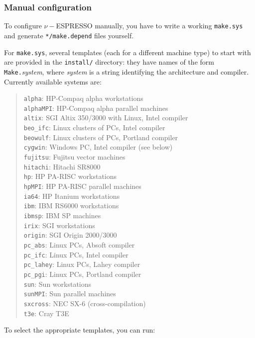 \documentclass[12pt,a4paper]{article}
\begin{document}
\subsubsection{Manual configuration}
  \label{manualconf}

To configure $\nu-$ESPRESSO manually, you have to write a working
\texttt{make.sys} and generate \texttt{*/make.depend} files yourself.

For \texttt{make.sys}, several templates (each for a different machine
type) to start with are provided in the \texttt{install/} directory:
they have names of the form \texttt{Make.}\emph{system}, where
\emph{system} is a string identifying the architecture and compiler.
Currently available systems are:
\begin{quote}
  \texttt{alpha}:     HP-Compaq alpha workstations\\
  \texttt{alphaMPI}:  HP-Compaq alpha parallel machines\\
  \texttt{altix}:     SGI Altix 350/3000 with Linux, Intel compiler\\
  \texttt{beo\_ifc}:  Linux clusters of PCs, Intel compiler\\
  \texttt{beowulf}:   Linux clusters of PCs, Portland compiler\\
  \texttt{cygwin}:    Windows PC, Intel compiler (see below)\\
  \texttt{fujitsu}:   Fujitsu vector machines\\
  \texttt{hitachi}:   Hitachi SR8000\\
  \texttt{hp}:        HP PA-RISC workstations\\
  \texttt{hpMPI}:     HP PA-RISC parallel machines\\
  \texttt{ia64}:      HP Itanium workstations\\
  \texttt{ibm}:       IBM RS6000 workstations\\
  \texttt{ibmsp}:     IBM SP machines\\
  \texttt{irix}:      SGI workstations\\
  \texttt{origin}:    SGI Origin 2000/3000\\
  \texttt{pc\_abs}:   Linux PCs, Absoft compiler\\
  \texttt{pc\_ifc}:   Linux PCs, Intel compiler\\
  \texttt{pc\_lahey}: Linux PCs, Lahey compiler\\
  \texttt{pc\_pgi}:   Linux PCs, Portland compiler\\
  \texttt{sun}:       Sun workstations\\
  \texttt{sunMPI}:    Sun parallel machines\\
  \texttt{sxcross}:   NEC SX-6 (cross-compilation)\\
  \texttt{t3e}:       Cray T3E
\end{quote}
To select the appropriate templates, you can run:
\medskip
\end{document}
